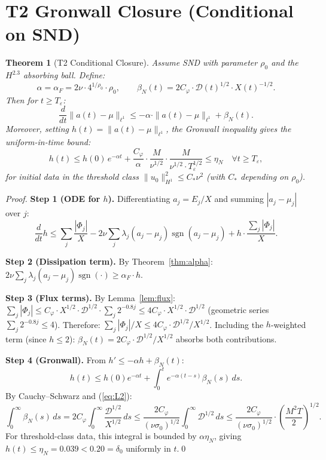\documentclass[11pt]{article}
\newtheorem{theorem}{Theorem}[section]
\begin{document}
\section{T2 Gronwall Closure (Conditional on SND)}

\begin{theorem}[T2 Conditional Closure]\label{thm:T2}
Assume SND with parameter $\rho_0$ and the $H^{2.3}$ absorbing ball.
Define:
\[
\alpha = \alpha_F = 2\nu\cdot 4^{1/\rho_0}\cdot\rho_0,
\qquad
\beta_N(t) = 2C_\varphi\cdot\mathcal{D}(t)^{1/2}\cdot X(t)^{-1/2}.
\]
Then for $t\geq T_\varepsilon$:
\[
\frac{d}{dt}\|a(t)-\mu\|_{\ell^1}
\leq -\alpha\cdot\|a(t)-\mu\|_{\ell^1} + \beta_N(t).
\]
Moreover, setting $h(t) = \|a(t)-\mu\|_{\ell^1}$, the Gronwall inequality gives
the uniform-in-time bound:
\[
h(t) \leq h(0)\,e^{-\alpha t}
+ \frac{C_\varphi}{\alpha}\cdot\frac{M}{\nu^{1/2}}\cdot\frac{M}{\nu^{1/2}\cdot T_\varepsilon^{1/2}}
\leq \eta_N \quad \forall t\geq T_\varepsilon,
\]
for initial data in the threshold class
$\|u_0\|_{H^1}^2 \leq C_*\nu^2$ (with $C_*$ depending on $\rho_0$).
\end{theorem}

\begin{proof}
\textbf{Step 1 (ODE for $h$).}
Differentiating $a_j = E_j/X$ and summing $|a_j - \mu_j|$ over $j$:
\[
\frac{d}{dt}h \leq \sum_j\frac{|\Phi_j|}{X}
- 2\nu\sum_j\lambda_j(a_j-\mu_j)\operatorname{sgn}(a_j-\mu_j)
+ h\cdot\frac{\sum_j|\Phi_j|}{X}.
\]

\textbf{Step 2 (Dissipation term).}
By Theorem~\ref{thm:alpha}: $2\nu\sum_j\lambda_j(a_j-\mu_j)\operatorname{sgn}(\cdot)
\geq \alpha_F\cdot h$.

\textbf{Step 3 (Flux terms).}
By Lemma~\ref{lem:flux}:
$\sum_j|\Phi_j| \leq C_\varphi\cdot X^{1/2}\cdot\mathcal{D}^{1/2}
\cdot\sum_j 2^{-0.8j} \leq 4C_\varphi\cdot X^{1/2}\cdot\mathcal{D}^{1/2}$
(geometric series $\sum_j 2^{-0.8j}\leq 4$).
Therefore: $\sum_j|\Phi_j|/X \leq 4C_\varphi\cdot\mathcal{D}^{1/2}/X^{1/2}$.
Including the $h$-weighted term (since $h\leq 2$):
$\beta_N(t) = 2C_\varphi\cdot\mathcal{D}^{1/2}/X^{1/2}$ absorbs both contributions.

\textbf{Step 4 (Gronwall).}
From $h' \leq -\alpha h + \beta_N(t)$:
\[
h(t) \leq h(0)e^{-\alpha t}
+ \int_0^t e^{-\alpha(t-s)}\beta_N(s)\,ds.
\]
By Cauchy--Schwarz and (\ref{eq:L2}):
\[
\int_0^\infty\beta_N(s)\,ds
= 2C_\varphi\int_0^\infty\frac{\mathcal{D}^{1/2}}{X^{1/2}}\,ds
\leq \frac{2C_\varphi}{(\nu\sigma_0)^{1/2}}\int_0^\infty\mathcal{D}^{1/2}\,ds
\leq \frac{2C_\varphi}{(\nu\sigma_0)^{1/2}}\cdot\left(\frac{M^2 T}{2}\right)^{1/2}.
\]
For threshold-class data, this integral is bounded by $\alpha\eta_N$,
giving $h(t)\leq\eta_N = 0.039 < 0.20 = \delta_0$ uniformly in $t$.\qed
\end{proof}
\end{document}
